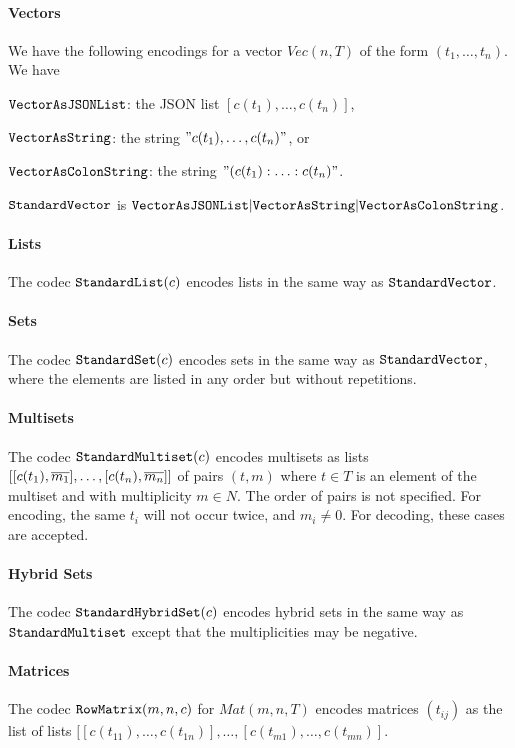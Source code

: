 \paragraph{Vectors}
We have the following encodings for a vector $Vec(n,T)$ of the form $(t_1, \ldots, t_n)$.
We have

$\cn{VectorAsJSONList}$: the JSON list $[c(t_1),\ldots,c(t_n)]$,

$\cn{VectorAsString}$: the string $"c(t_1),\ldots,c(t_n)"$, or

$\cn{VectorAsColonString}$: the string $"(c(t_1):\ldots:c(t_n)"$.

$\cn{StandardVector}$ is $\cunion{\cn{VectorAsJSONList}, \cn{VectorAsString}, \cn{VectorAsColonString}}$.


\paragraph{Lists}
The codec $\cn{StandardList}(c)$ encodes lists in the same way as $\cn{StandardVector}$.

\paragraph{Sets}
The codec $\cn{StandardSet}(c)$ encodes sets in the same way as $\cn{StandardVector}$, where the elements are listed in any order but without repetitions.

\paragraph{Multisets}
The codec $\cn{StandardMultiset}(c)$ encodes multisets as lists $[[c(t_1),\ov{m_1}], \ldots, [c(t_n),\ov{m_n}]]$ of pairs $(t,m)$ where $t\in T$ is an element of the multiset and with multiplicity $m\in N$.
The order of pairs is not specified.
For encoding, the same $t_i$ will not occur twice, and $m_i\neq 0$. For decoding, these cases are accepted.

\paragraph{Hybrid Sets}
The codec $\cn{StandardHybridSet}(c)$ encodes hybrid sets in the same way as $\cn{StandardMultiset}$ except that the multiplicities may be negative.

\paragraph{Matrices}
The codec $\cn{RowMatrix}(m,n,c)$ for $Mat(m,n,T)$ encodes matrices $(t_{ij})$ as the list of lists $[[c(t_{11}),\ldots,c(t_{1n})], \ldots, [c(t_{m1}),\ldots,c(t_{mn})]$.

